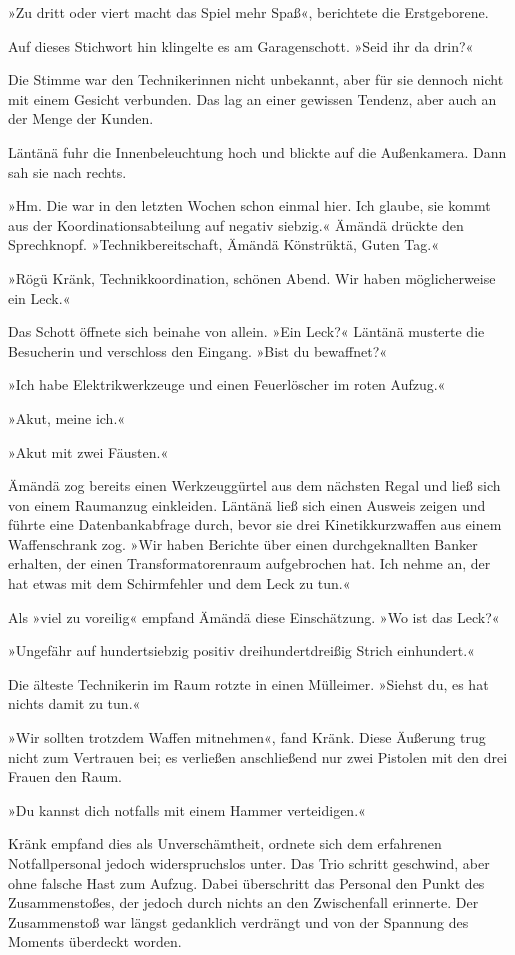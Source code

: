 »Zu dritt oder viert macht das Spiel mehr Spaß«, berichtete die Erstgeborene.

Auf dieses Stichwort hin klingelte es am Garagenschott. »Seid ihr da drin?«

Die Stimme war den Technikerinnen nicht unbekannt, aber für sie dennoch nicht mit einem Gesicht verbunden. Das lag an einer gewissen Tendenz, aber auch an der Menge der Kunden.

Läntänä fuhr die Innenbeleuchtung hoch und blickte auf die Außenkamera. Dann sah sie nach rechts.

»Hm. Die war in den letzten Wochen schon einmal hier. Ich glaube, sie kommt aus der Koordinationsabteilung auf negativ siebzig.« Ämändä drückte den Sprechknopf. »Technikbereitschaft, Ämändä Könstrüktä, Guten Tag.«

»Rögü Kränk, Technikkoordination, schönen Abend. Wir haben möglicherweise ein Leck.«

Das Schott öffnete sich beinahe von allein. »Ein Leck?« Läntänä musterte die Besucherin und verschloss den Eingang. »Bist du bewaffnet?«

»Ich habe Elektrikwerkzeuge und einen Feuerlöscher im roten Aufzug.«

»Akut, meine ich.«

»Akut mit zwei Fäusten.«

Ämändä zog bereits einen Werkzeuggürtel aus dem nächsten Regal und ließ sich von einem Raumanzug einkleiden. Läntänä ließ sich einen Ausweis zeigen und führte eine Datenbankabfrage durch, bevor sie drei Kinetikkurzwaffen aus einem Waffenschrank zog. »Wir haben Berichte über einen durchgeknallten Banker erhalten, der einen Transformatorenraum aufgebrochen hat. Ich nehme an, der hat etwas mit dem Schirmfehler und dem Leck zu tun.«

Als »viel zu voreilig« empfand Ämändä diese Einschätzung. »Wo ist das Leck?«

»Ungefähr auf hundertsiebzig positiv dreihundertdreißig Strich einhundert.«

Die älteste Technikerin im Raum rotzte in einen Mülleimer. »Siehst du, es hat nichts damit zu tun.«

»Wir sollten trotzdem Waffen mitnehmen«, fand Kränk. Diese Äußerung trug nicht zum Vertrauen bei; es verließen anschließend nur zwei Pistolen mit den drei Frauen den Raum.

»Du kannst dich notfalls mit einem Hammer verteidigen.«

Kränk empfand dies als Unverschämtheit, ordnete sich dem erfahrenen Notfallpersonal jedoch widerspruchslos unter. Das Trio schritt geschwind, aber ohne falsche Hast zum Aufzug. Dabei überschritt das Personal den Punkt des Zusammenstoßes, der jedoch durch nichts an den Zwischenfall erinnerte. Der Zusammenstoß war längst gedanklich verdrängt und von der Spannung des Moments überdeckt worden.

